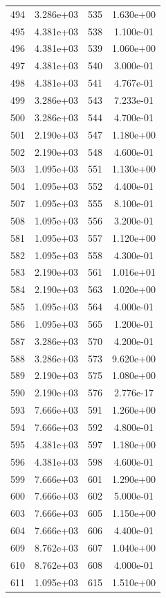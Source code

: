 \documentclass[12pt]{article}
\begin{document}
\begin{longtable}{@{}cccc@{}}
494 & 3.286e+03 & 535 & 1.630e+00 \\
495 & 4.381e+03 & 538 & 1.100e-01 \\
496 & 4.381e+03 & 539 & 1.060e+00 \\
497 & 4.381e+03 & 540 & 3.000e-01 \\
498 & 4.381e+03 & 541 & 4.767e-01 \\
499 & 3.286e+03 & 543 & 7.233e-01 \\
500 & 3.286e+03 & 544 & 4.700e-01 \\
501 & 2.190e+03 & 547 & 1.180e+00 \\
502 & 2.190e+03 & 548 & 4.600e-01 \\
503 & 1.095e+03 & 551 & 1.130e+00 \\
504 & 1.095e+03 & 552 & 4.400e-01 \\
507 & 1.095e+03 & 555 & 8.100e-01 \\
508 & 1.095e+03 & 556 & 3.200e-01 \\
581 & 1.095e+03 & 557 & 1.120e+00 \\
582 & 1.095e+03 & 558 & 4.300e-01 \\
583 & 2.190e+03 & 561 & 1.016e+01 \\
584 & 2.190e+03 & 563 & 1.020e+00 \\
585 & 1.095e+03 & 564 & 4.000e-01 \\
586 & 1.095e+03 & 565 & 1.200e-01 \\
587 & 3.286e+03 & 570 & 4.200e-01 \\
588 & 3.286e+03 & 573 & 9.620e+00 \\
589 & 2.190e+03 & 575 & 1.080e+00 \\
590 & 2.190e+03 & 576 & 2.776e-17 \\
593 & 7.666e+03 & 591 & 1.260e+00 \\
594 & 7.666e+03 & 592 & 4.800e-01 \\
595 & 4.381e+03 & 597 & 1.180e+00 \\
596 & 4.381e+03 & 598 & 4.600e-01 \\
599 & 7.666e+03 & 601 & 1.290e+00 \\
600 & 7.666e+03 & 602 & 5.000e-01 \\
603 & 7.666e+03 & 605 & 1.150e+00 \\
604 & 7.666e+03 & 606 & 4.400e-01 \\
609 & 8.762e+03 & 607 & 1.040e+00 \\
610 & 8.762e+03 & 608 & 4.000e-01 \\
611 & 1.095e+03 & 615 & 1.510e+00 \\

\end{longtable}
\end{document}
